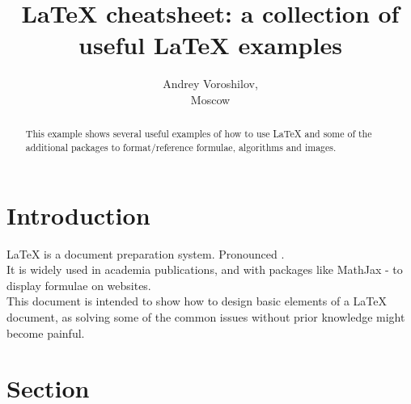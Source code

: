 \documentclass{article}
\begin{document}
\title{\LaTeX{} cheatsheet: a collection of useful \LaTeX{} examples}
\author{
Andrey Voroshilov,\\
Moscow
}
\date{}
\maketitle

\begin{abstract}
This example shows several useful examples of how to use \LaTeX{} and some of the additional packages to format/reference formulae, algorithms and images.
\end{abstract}

\thispagestyle{empty}		%

\section*{Introduction}
\LaTeX{} is a document preparation system. Pronounced .\\

It is widely used in academia publications, and with packages like MathJax - to display formulae on websites. \\

This document is intended to show how to design basic elements of a \LaTeX{} document, as solving some of the common issues without prior knowledge might become painful.\\

\newpage

\tableofcontents

\newpage

\section{Section}
\end{document}
